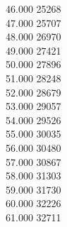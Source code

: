 { 46.000	25268 \\
 47.000	25707 \\
 48.000	26970 \\
 49.000	27421 \\
 50.000	27896 \\
 51.000	28248 \\
 52.000	28679 \\
 53.000	29057 \\
 54.000	29526 \\
 55.000	30035 \\
 56.000	30480 \\
 57.000	30867 \\
 58.000	31303 \\
 59.000	31730 \\
 60.000	32226 \\
 61.000	32711 \\
}

